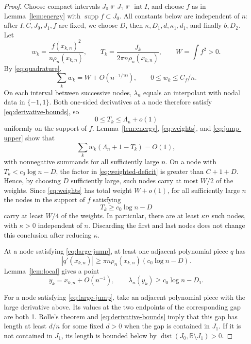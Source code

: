 \documentclass[11pt]{article}
\numberwithin{equation}{section}
\DeclareMathOperator{\supp}{supp}
\begin{document}
\begin{proof}
Choose compact intervals \(J_0\Subset J_1\Subset\operatorname{int}I\), and
choose \(f\) as in Lemma~\ref{lem:energy} with \(\supp f\subset J_0\).
All constants below are independent of \(n\): after \(I,C,J_0,J_1,f\) are
fixed, we choose \(D\), then \(\kappa,D_1,d,\kappa_1,d_1\), and finally
\(b,D_2\). Let
\[
 w_k=\frac{f(x_{k,n})^2}{n\rho_n(x_{k,n})},\qquad
 T_k=\frac{J_k}{2\pi n\rho_n(x_{k,n})},\qquad W=\int f^2>0.
\]
By \eqref{eq:quadrature},
\begin{equation}\label{eq:weights}
 \sum_kw_k=W+O(n^{-1/10}),\qquad 0\le w_k\le C_f/n.
\end{equation}
On each interval between successive nodes, \(\lambda_n\) equals an interpolant
with nodal data in \(\{-1,1\}\). Both one-sided derivatives at a node
therefore satisfy \eqref{eq:derivative-bounds}, so
\begin{equation}\label{eq:jump-upper}
 0\le T_k\le\Lambda_n+o(1)
\end{equation}
uniformly on the support of \(f\). Lemma~\ref{lem:energy}, \eqref{eq:weights},
and \eqref{eq:jump-upper} show that
\begin{equation}\label{eq:weighted-deficit}
 \sum_kw_k(\Lambda_n+1-T_k)=O(1),
\end{equation}
with nonnegative summands for all sufficiently large \(n\). On a node with
\(T_k<c_0\log n-D\), the factor in \eqref{eq:weighted-deficit} is greater
than \(C+1+D\). Hence, by choosing \(D\) sufficiently large, such nodes
carry at most \(W/2\) of the weights. Since \eqref{eq:weights} has total
weight \(W+o(1)\), for all
sufficiently large \(n\) the nodes in the support of \(f\) satisfying
\begin{equation}\label{eq:large-jump}
 T_k\ge c_0\log n-D
\end{equation}
carry at least \(W/4\) of the weights. In particular, there are at least
\(\kappa n\) such nodes, with \(\kappa>0\) independent of \(n\). Discarding the first and last nodes does not change this conclusion
after reducing \(\kappa\).

At a node satisfying \eqref{eq:large-jump}, at least one adjacent polynomial
piece \(q\) has
\[
 |q'(x_{k,n})|\ge\pi n\rho_n(x_{k,n})(c_0\log n-D).
\]
Lemma~\ref{lem:local} gives a point
\begin{equation}\label{eq:high-points}
 y_k=x_{k,n}+O(n^{-1}),\qquad
 \lambda_n(y_k)\ge c_0\log n-D_1.
\end{equation}

For a node satisfying \eqref{eq:large-jump}, take an adjacent polynomial
piece with the large derivative above. Its values at the two endpoints of the
corresponding gap are both 1. Rolle's theorem and
\eqref{eq:derivative-bounds} imply that this gap has length at least \(d/n\)
for some fixed \(d>0\) when the gap is contained in \(J_1\). If it is not
contained in \(J_1\), its length is bounded below by
\(\operatorname{dist}(J_0,\mathbb R\setminus J_1)>0\).


\end{proof}
\end{document}
